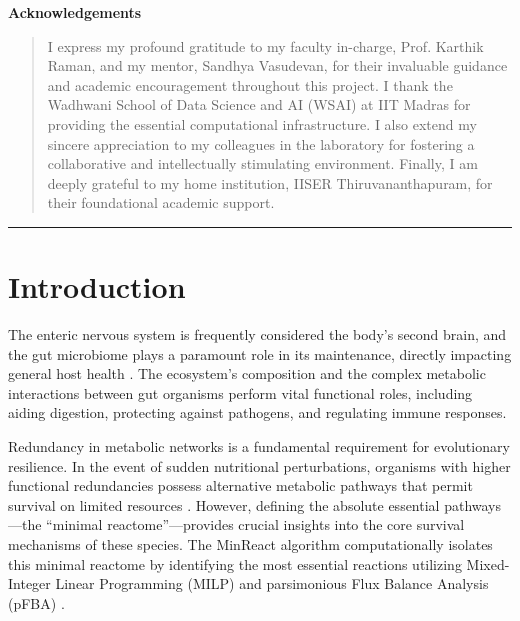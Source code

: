 \documentclass[11pt, a4paper]{article}
\begin{document}
\begin{titlepage}
    \vspace{0.2cm}
    \begin{center}
        \textbf{Acknowledgements}
    \end{center}
    \vspace{-0.3cm}
    \begin{quote}
        \small \singlespacing
        I express my profound gratitude to my faculty in-charge, Prof. Karthik Raman, and my mentor, Sandhya Vasudevan, for their invaluable guidance and academic encouragement throughout this project. I thank the Wadhwani School of Data Science and AI (WSAI) at IIT Madras for providing the essential computational infrastructure. I also extend my sincere appreciation to my colleagues in the laboratory for fostering a collaborative and intellectually stimulating environment. Finally, I am deeply grateful to my home institution, IISER Thiruvananthapuram, for their foundational academic support.
    \end{quote}
    
    \vfill
    \noindent\rule{\textwidth}{0.8pt}
\end{titlepage}

\newpage
\tableofcontents
\thispagestyle{empty}

\newpage
\setcounter{page}{1}

\section{Introduction}
The enteric nervous system is frequently considered the body's second brain, and the gut microbiome plays a paramount role in its maintenance, directly impacting general host health \cite{2}. The ecosystem's composition and the complex metabolic interactions between gut organisms perform vital functional roles, including aiding digestion, protecting against pathogens, and regulating immune responses.

Redundancy in metabolic networks is a fundamental requirement for evolutionary resilience. In the event of sudden nutritional perturbations, organisms with higher functional redundancies possess alternative metabolic pathways that permit survival on limited resources \cite{1}. However, defining the absolute essential pathways---the ``minimal reactome''---provides crucial insights into the core survival mechanisms of these species. The MinReact algorithm computationally isolates this minimal reactome by identifying the most essential reactions utilizing Mixed-Integer Linear Programming (MILP) and parsimonious Flux Balance Analysis (pFBA) \cite{1}. 
\end{document}
